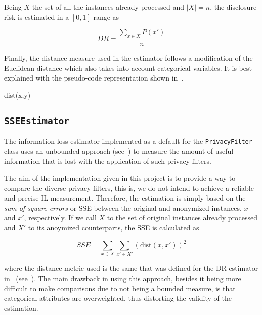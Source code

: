 Being $X$ the set of all the instances already processed and $\vert X \vert = n$, the disclosure risk is estimated in a $[0,1]$ range as

\begin{equation}
DR = \frac{\sum_{x \in X}P(x')}{n}
\end{equation}

Finally, the distance measure used in the estimator follows a modification of the Euclidean distance which also takes into account categorical variables. It is best explained with the pseudo-code representation shown in~.

\begin{procedure}[H]
\caption{dist(x,y)\label{al:distance}}
\end{procedure}

\subsection{\texttt{SSEEstimator}}
\label{Implementation:Estimators:SSE}

The information loss estimator implemented as a default for the \texttt{PrivacyFilter} class uses an unbounded approach (see~) to measure the amount of useful information that is lost with the application of such privacy filters.

The aim of the implementation given in this project is to provide a way to compare the diverse privacy filters, this is, we do not intend to achieve a reliable and precise IL measurement. Therefore, the estimation is simply based on the \textit{sum of square errors} or SSE between the original and anonymized instances, $x$ and $x'$, respectively. If we call $X$ to the set of original instances already processed and $X'$ to its anoymized counterparts, the SSE is calculated as

\begin{equation}
SSE = \sum_{x \in X} \sum_{x' \in X'} (\mathrm{dist}(x,x'))^2
\end{equation}

where the distance metric used is the same that was defined for the DR estimator in~ (see~). The main drawback in using this approach, besides it being more difficult to make comparisons due to not being a bounded measure, is that categorical attributes are overweighted, thus distorting the validity of the estimation.